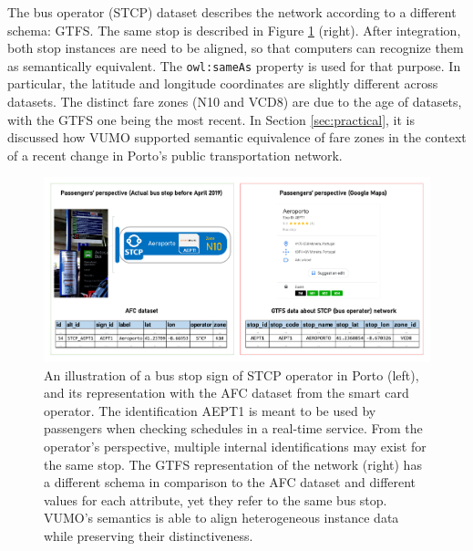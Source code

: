 \documentclass[]{interact}
\theoremstyle{plain}%
\theoremstyle{definition}
\theoremstyle{remark}
\theoremstyle{definition}
\begin{document}
The bus operator (STCP) dataset describes the network according to a different schema: GTFS. The same stop is described in Figure \ref{fig:stcp_stop} (right). After integration, both stop instances are need to be aligned, so that computers can recognize them as semantically equivalent. The \texttt{owl:sameAs} property is used for that purpose. In particular, the latitude and longitude coordinates are slightly different across datasets. The distinct fare zones (N10 and VCD8) are due to the age of datasets, with the GTFS one being the most recent. In Section \ref{sec:practical}, it is discussed how VUMO supported semantic equivalence of fare zones in the context of a recent change in Porto's public transportation network.

\begin{figure}[htbp]
	\centering
	\includegraphics[width=\linewidth]{images/aept_dataset.pdf}
	\caption{An illustration of a bus stop sign of STCP operator in Porto (left), and its representation with the AFC dataset from the smart card operator. The identification AEPT1 is meant to be used by passengers when checking schedules in a real-time service. From the operator's perspective, multiple internal identifications may exist for the same stop. The GTFS representation of the network (right) has a different schema in comparison to the AFC dataset and different values for each attribute, yet they refer to the same bus stop. VUMO's semantics is able to align heterogeneous instance data while preserving their distinctiveness.}
	\label{fig:stcp_stop}
\end{figure}

%
\end{document}
